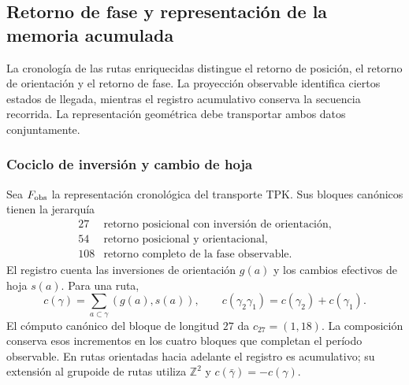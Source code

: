 
\subsection{Retorno de fase y representación de la memoria acumulada}
\label{vii:sec:retorno-memoria-gravedad}

La cronología de las rutas enriquecidas distingue el retorno de posición,
el retorno de orientación y el retorno de fase. La proyección observable
identifica ciertos estados de llegada, mientras el registro acumulativo
conserva la secuencia recorrida. La representación geométrica debe
transportar ambos datos conjuntamente.

\subsubsection{Cociclo de inversión y cambio de hoja}
\label{vii:subsec:cociclo-memoria}

Sea \(F_{\rm obs}\) la representación cronológica del transporte TPK.
Sus bloques canónicos tienen la jerarquía
\[
\begin{array}{c|l}
27&\text{retorno posicional con inversión de orientación},\\
54&\text{retorno posicional y orientacional},\\
108&\text{retorno completo de la fase observable}.
\end{array}
\]
El registro cuenta las inversiones de orientación \(g(a)\) y los
cambios efectivos de hoja \(s(a)\). Para una ruta,
\begin{equation}
 c(\gamma)=\sum_{a\subset\gamma}(g(a),s(a)),\qquad
 c(\gamma_2\gamma_1)=c(\gamma_2)+c(\gamma_1).
 \label{vii:eq:cociclo-ruta}
\end{equation}
El cómputo canónico del bloque de longitud \(27\) da
\(c_{27}=(1,18)\). La composición conserva esos incrementos en
los cuatro bloques que completan el período observable.
En rutas orientadas hacia adelante el registro es acumulativo;
su extensión al grupoide de rutas utiliza \(\mathbb Z^2\) y
\(c(\bar\gamma)=-c(\gamma)\).

